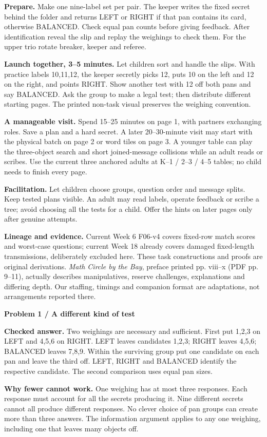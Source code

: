 \documentclass[11pt]{article}
\newcommand{\parttitle}[1]{{\large\bfseries\color{ink}#1}\par}
\newcommand{\labelled}[2]{\textbf{#1} #2\par}
\begin{document}
\labelled{Prepare.}{Make one nine-label set per pair. The keeper writes the fixed secret behind the folder and returns LEFT or RIGHT if that pan contains its card, otherwise BALANCED. Check equal pan counts before giving feedback. After identification reveal the slip and replay the weighings to check them. For the upper trio rotate breaker, keeper and referee.}
\labelled{Launch together, 3--5 minutes.}{Let children sort and handle the slips. With practice labels 10,11,12, the keeper secretly picks 12, puts 10 on the left and 12 on the right, and points RIGHT. Show another test with 12 off both pans and say BALANCED. Ask the group to make a legal test; then distribute different starting pages. The printed non-task visual preserves the weighing convention.}
\labelled{A manageable visit.}{Spend 15--25 minutes on page 1, with partners exchanging roles. Save a plan and a hard secret. A later 20--30-minute visit may start with the physical batch on page 2 or word tiles on page 3. A younger table can play the three-object search and short joined-message collisions while an adult reads or scribes. Use the current three anchored adults at K--1 / 2--3 / 4--5 tables; no child needs to finish every page.}
\labelled{Facilitation.}{Let children choose groups, question order and message splits. Keep tested plans visible. An adult may read labels, operate feedback or scribe a tree; avoid choosing all the tests for a child. Offer the hints on later pages only after genuine attempts.}
\labelled{Lineage and evidence.}{Current Week 6 F06-v4 covers fixed-row match scores and worst-case questions; current Week 18 already covers damaged fixed-length transmissions, deliberately excluded here. These task constructions and proofs are original derivations. \emph{Math Circle by the Bay}, preface printed pp. viii--x (PDF pp. 9--11), actually describes manipulatives, reserve challenges, explanations and differing depth. Our staffing, timings and companion format are adaptations, not arrangements reported there.}
\newpage
\parttitle{Problem 1 / A different kind of test}
\labelled{Checked answer.}{Two weighings are necessary and sufficient. First put 1,2,3 on LEFT and 4,5,6 on RIGHT. LEFT leaves candidates 1,2,3; RIGHT leaves 4,5,6; BALANCED leaves 7,8,9. Within the surviving group put one candidate on each pan and leave the third off. LEFT, RIGHT and BALANCED identify the respective candidate. The second comparison uses equal pan sizes.}
\labelled{Why fewer cannot work.}{One weighing has at most three responses. Each response must account for all the secrets producing it. Nine different secrets cannot all produce different responses. No clever choice of pan groups can create more than three answers. The information argument applies to any one weighing, including one that leaves many objects off.}
\end{document}
